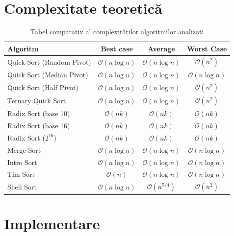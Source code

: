\documentclass[12pt]{article}
\begin{document}
\section{Complexitate teoretică}

\begin{table}[H]
    \centering
    \caption{Tabel comparativ al complexităților algoritmilor analizați}
    \begin{tabular}{lccc}
    \toprule
    \textbf{Algoritm} & \textbf{Best case} & \textbf{Average} & \textbf{Worst Case} \\
    \midrule
    Quick Sort (Random Pivot) & $\mathcal{O}(n \log n)$ & $\mathcal{O}(n \log n)$ & $\mathcal{O}(n^2)$ \\
    Quick Sort (Median Pivot) & $\mathcal{O}(n \log n)$ & $\mathcal{O}(n \log n)$ & $\mathcal{O}(n \log n)$ \\
    Quick Sort (Half Pivot)   & $\mathcal{O}(n \log n)$ & $\mathcal{O}(n \log n)$ & $\mathcal{O}(n^2)$ \\
    Ternary Quick Sort        & $\mathcal{O}(n \log n)$ & $\mathcal{O}(n \log n)$ & $\mathcal{O}(n^2)$ \\
    Radix Sort (base 10)      & $\mathcal{O}(nk)$       & $\mathcal{O}(nk)$       & $\mathcal{O}(nk)$ \\
    Radix Sort (base 16)      & $\mathcal{O}(nk)$       & $\mathcal{O}(nk)$       & $\mathcal{O}(nk)$ \\
    Radix Sort ($2^{16}$)     & $\mathcal{O}(nk)$       & $\mathcal{O}(nk)$       & $\mathcal{O}(nk)$ \\
    Merge Sort                & $\mathcal{O}(n \log n)$ & $\mathcal{O}(n \log n)$ & $\mathcal{O}(n \log n)$ \\
    Intro Sort                & $\mathcal{O}(n \log n)$ & $\mathcal{O}(n \log n)$ & $\mathcal{O}(n \log n)$ \\
    Tim Sort                  & $\mathcal{O}(n)$        & $\mathcal{O}(n \log n)$ & $\mathcal{O}(n \log n)$ \\
    Shell Sort                & $\mathcal{O}(n \log n)$ & $\mathcal{O}(n^{5/4})$  & $\mathcal{O}(n^2)$ \\
    \bottomrule
    \end{tabular}
    \end{table}

\section{Implementare}
\end{document}
